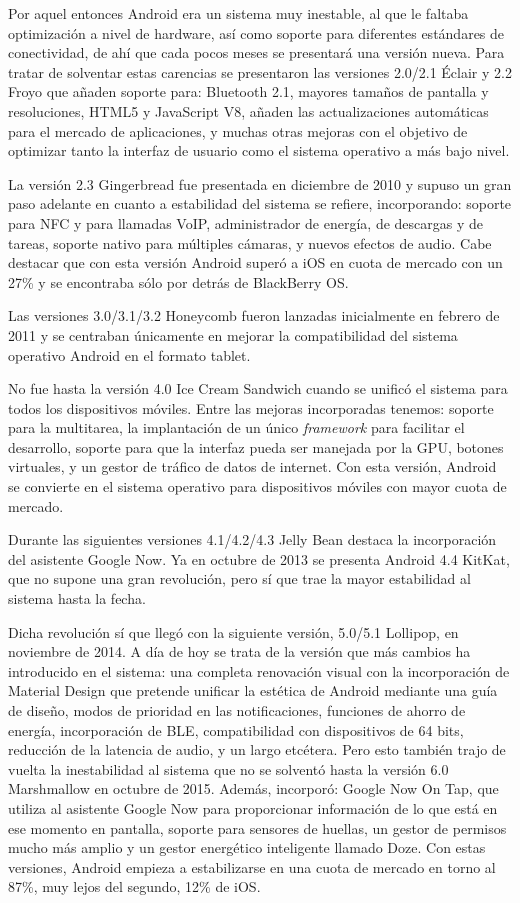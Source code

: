 Por aquel entonces Android era un sistema muy inestable, al que le faltaba optimización a nivel de hardware, así como soporte para diferentes estándares de conectividad, de ahí que cada pocos meses se presentará una versión nueva. Para tratar de solventar estas carencias se presentaron las versiones 2.0/2.1 Éclair y 2.2 Froyo que añaden soporte para: Bluetooth 2.1, mayores tamaños de pantalla y resoluciones, HTML5 y JavaScript V8, añaden las actualizaciones automáticas para el mercado de aplicaciones, y muchas otras mejoras con el objetivo de optimizar tanto la interfaz de usuario como el sistema operativo a más bajo nivel.

La versión 2.3 Gingerbread fue presentada en diciembre de 2010 y supuso un gran paso adelante en cuanto a estabilidad del sistema se refiere, incorporando: soporte para \gls{NFC} y para llamadas \gls{VoIP}, administrador de energía, de descargas y de tareas, soporte nativo para múltiples cámaras, y nuevos efectos de audio. Cabe destacar que con esta versión Android superó a iOS en cuota de mercado con un 27\% y se encontraba sólo por detrás de BlackBerry OS.

Las versiones 3.0/3.1/3.2 Honeycomb fueron lanzadas inicialmente en febrero de 2011 y se centraban únicamente en mejorar la compatibilidad del sistema operativo Android en el formato tablet.

No fue hasta la versión 4.0 Ice Cream Sandwich cuando se unificó el sistema para todos los dispositivos móviles. Entre las mejoras incorporadas tenemos: soporte para la multitarea, la implantación de un único \textit{framework} para facilitar el desarrollo, soporte para que la interfaz pueda ser manejada por la \gls{GPU}, botones virtuales, y un gestor de tráfico de datos de internet. Con esta versión, Android se convierte en el sistema operativo para dispositivos móviles con mayor cuota de mercado.

Durante las siguientes versiones 4.1/4.2/4.3 Jelly Bean destaca la incorporación del asistente Google Now. Ya en octubre de 2013 se presenta Android 4.4 KitKat, que no supone una gran revolución, pero sí que trae la mayor estabilidad al sistema hasta la fecha.

Dicha revolución sí que llegó con la siguiente versión, 5.0/5.1 Lollipop, en noviembre de 2014. A día de hoy se trata de la versión que más cambios ha introducido en el sistema: una completa renovación visual con la incorporación de Material Design que pretende unificar la estética de Android mediante una guía de diseño, modos de prioridad en las notificaciones, funciones de ahorro de energía, incorporación de \gls{BLE}, compatibilidad con dispositivos de 64 bits, reducción de la latencia de audio, y un largo etcétera. Pero esto también trajo de vuelta la inestabilidad al sistema que no se solventó hasta la versión 6.0 Marshmallow en octubre de 2015. Además, incorporó: Google Now On Tap, que utiliza al asistente Google Now para proporcionar información de lo que está en ese momento en pantalla, soporte para sensores de huellas, un gestor de permisos mucho más amplio y un gestor energético inteligente llamado Doze. Con estas versiones, Android empieza a estabilizarse en una cuota de mercado en torno al 87\%, muy lejos del segundo, 12\% de iOS.

